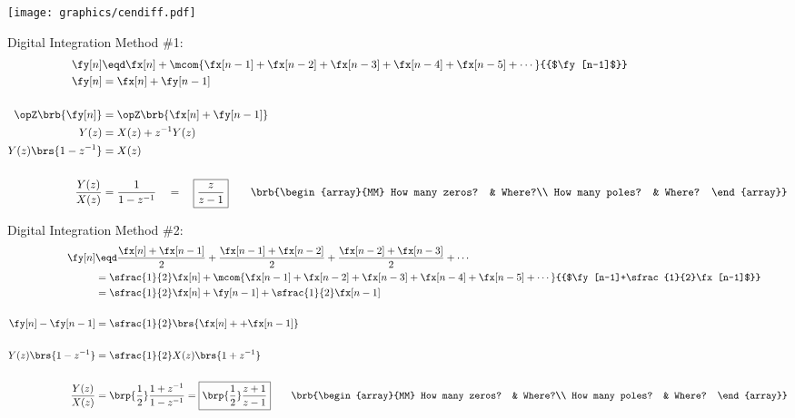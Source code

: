 \texttt{[image: graphics/cendiff.pdf]}



Digital Integration Method \#1: 
\vfill
{\begin{align*}
  \fy[n]
    &\eqd \fx[n] + \mcom{\fx[n-1] + \fx[n-2] + \fx[n-3] + \fx[n-4] + \fx[n-5] + \cdots}{{$\fy[n-1]$}}
  \\
  \fy[n] &=    \fx[n] + \fy[n-1]
  \\\\
  \opZ\brb{\fy[n]} &= \opZ\brb{\fx[n] + \fy[n-1]}
  \\
  Y(z) &= X(z) + z^{-1}Y(z)
  \\
  Y(z)\brs{1-z^{-1}} &= X(z)
  \\\\
  \frac{Y(z)}{X(z)} &= \frac{1}{1-z^{-1}} \quad=\quad \boxed{\frac{z}{z-1}}
  \qquad\brb{\begin{array}{MM}
    How many zeros? & Where?\\
    How many poles? & Where?
  \end{array}}
\end{align*}}


Digital Integration Method \#2: 
\vfill
{\begin{align*}
  \fy[n]
    &\eqd \frac{\fx[n]+\fx[n-1]}{2} + \frac{\fx[n-1]+\fx[n-2]}{2} + \frac{\fx[n-2]+\fx[n-3]}{2} + \cdots
  \\&=    \sfrac{1}{2}\fx[n] + \mcom{\fx[n-1] + \fx[n-2] + \fx[n-3] + \fx[n-4] + \fx[n-5] + \cdots}{{$\fy[n-1]+\sfrac{1}{2}\fx[n-1]$}}
  \\&=    \sfrac{1}{2}\fx[n] + \fy[n-1]+\sfrac{1}{2}\fx[n-1]
  \\\\
  \fy[n]-\fy[n-1]&=    \sfrac{1}{2}\brs{\fx[n] + +\fx[n-1]} 
  \\\\
  Y(z)\brs{1-z^{-1}} &= \sfrac{1}{2} X(z)\brs{1+z^{-1}}
  \\\\
  \frac{Y(z)}{X(z)} 
    &= \brp{\frac{1}{2}} \frac{1+z^{-1}}{1-z^{-1}}
     = \boxed{\brp{\frac{1}{2}} \frac{z+1}{z-1}} 
  \qquad\brb{\begin{array}{MM}
    How many zeros? & Where?\\
    How many poles? & Where?
  \end{array}}
\end{align*}}


